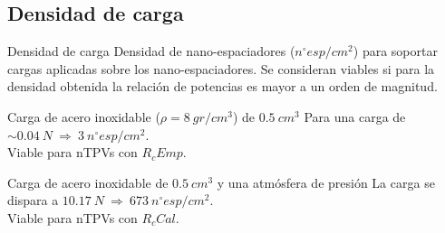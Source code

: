 \documentclass[spanish,a4paper]{beamer}%
\begin{document}
	\subsection{Densidad de carga}
	\begin{frame}{Densidad de carga}
	\vspace{-20pt}
	{\footnotesize
	Densidad de nano-espaciadores ($n^{\circ}esp/cm^2$) para soportar cargas aplicadas sobre los nano-espaciadores. Se consideran viables si para la densidad obtenida la relación de potencias es mayor a un orden de magnitud.
	}
	\vspace{10pt}
	\begin{block}{Carga de acero inoxidable ($\rho = 8\ gr/cm^3$) de $0.5\ cm^3$}
		Para una carga de $\sim 0.04 \ N \ \Longrightarrow \ 3 \ n^{\circ}esp/cm^2$.\\ Viable para nTPVs con $R_cEmp$.
	\end{block}
		\begin{block}{Carga de acero inoxidable de $0.5\ cm^3$ y una atmósfera de presión}
		La carga se dispara a $10.17 \ N \ \Longrightarrow \ 673 \ n^{\circ}esp/cm^2$.\\ Viable para nTPVs con $R_cCal$.
	\end{block}

	\end{frame}
	
\end{document}
